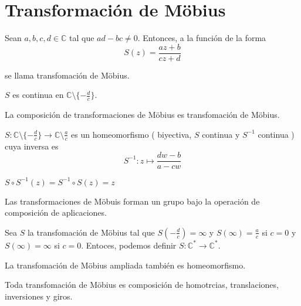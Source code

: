 \section{Transformación de Möbius}
\begin{defn}
  Sean $a, b, c, d \in \mathbb{C}$ tal que $ ad - b c \neq 0$. Entonces, a la función de la forma 
  \[ 
    S(z) = \frac{az +b}{cz + d}
  \]

  se llama transfomación de Möbius.
\end{defn}

\begin{obs}
  $S$ es continua en $\mathbb{C} \setminus \{ -\frac{d}{c} \}$.
\end{obs}

\begin{prop}
  La composición de transformaciones de Möbius es transfomación de Möbius.
\end{prop}

\begin{prop}
  $S:\mathbb{C} \setminus \{ -\frac{d}{c} \} \to \mathbb{C} \setminus \frac{a}{c}$ es un homeomorfismo ( biyectiva, $S$ continua y $S^{-1}$ continua ) cuya inversa es
  \[ 
    S^{-1}: z \mapsto \frac{dw - b}{a - cw} 
  \] 
  
\end{prop}

\begin{obs}
  $S \circ S^{-1}(z) = S^{-1} \circ S (z) = z$
\end{obs}

\begin{obs}
  Las transformaciones de Möbuis forman un grupo bajo la operación de composición de aplicaciones.
\end{obs}

\begin{defn}
  Sea $S$ la transfomación de Möbius tal que $S(-\frac{d}{c}) = \infty$ y $S(\infty) = \frac{a}{c}$ si $c=0$ y $S(\infty) = \infty$ si $c=0$. Entoces, podemos definir $S: \mathbb{C}^{*} \to \mathbb{C}^*$.
\end{defn}

\begin{obs}
  La transfomación de Möbius ampliada también es homeomorfismo.
\end{obs}

\begin{theo}
  Toda transfomación de Möbius es composición de homotrcias, translaciones, inversiones y giros.
\end{theo}
